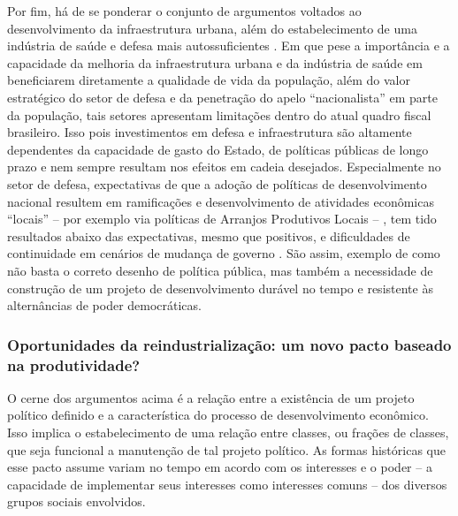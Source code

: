 Por fim, há de se ponderar o conjunto de argumentos voltados ao
desenvolvimento da infraestrutura urbana, além do estabelecimento de uma
indústria de saúde e defesa mais autossuficientes \citep{cndi_nova_2024}.
Em que pese a importância e a capacidade da melhoria da infraestrutura
urbana e da indústria de saúde em beneficiarem diretamente a qualidade
de vida da população, além do valor estratégico do setor de defesa e da
penetração do apelo ``nacionalista'' em parte da população, tais setores
apresentam limitações dentro do atual quadro fiscal brasileiro. Isso
pois investimentos em defesa e infraestrutura são altamente dependentes
da capacidade de gasto do Estado, de políticas públicas de longo prazo e
nem sempre resultam nos efeitos em cadeia desejados. Especialmente no
setor de defesa, expectativas de que a adoção de políticas de
desenvolvimento nacional resultem em ramificações e desenvolvimento de
atividades econômicas ``locais'' -- por exemplo via políticas de
Arranjos Produtivos Locais -- , tem tido resultados abaixo das
expectativas, mesmo que positivos, e dificuldades de continuidade em
cenários de mudança de governo . São assim,
exemplo de como não basta o correto desenho de política pública, mas
também a necessidade de construção de um projeto de desenvolvimento
durável no tempo e resistente às alternâncias de poder democráticas.

\subsubsection{Oportunidades da reindustrialização: um novo pacto baseado na produtividade?}

O cerne dos argumentos acima é a relação entre a existência de um
projeto político definido e a característica do processo de
desenvolvimento econômico. Isso implica o estabelecimento de uma relação
entre classes, ou frações de classes, que seja funcional a manutenção de
tal projeto político. As formas históricas que esse pacto assume variam
no tempo em acordo com os interesses e o poder -- a capacidade de
implementar seus interesses como interesses comuns  -- dos
diversos grupos sociais envolvidos.

